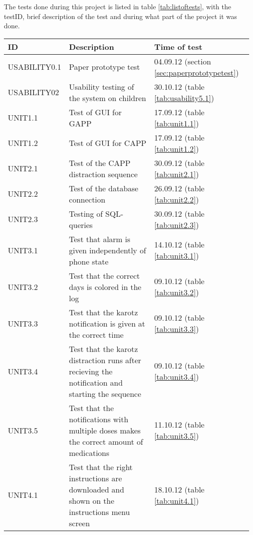The tests done during this project is listed in table \ref{tab:listoftests}, with the testID, brief description of the test
and during what part of the project it was done.
\begin{table}
	\begin{center}
		\begin{tabular}{|p{3.3cm}|p{10.0cm}|p{4.0cm}|}
			\hline
				\bf{ID} & \bf{Description}& \bf{Time of test}\\
			\hline
				USABILITY0.1 &	 Paper prototype test &  						04.09.12 (section \ref{sec:paperprototypetest})\\
				\hline
				USABILITY02 & 	Usability testing of the system on children & 			30.10.12 (table \ref{tab:usability5.1})\\
				\hline
				UNIT1.1 &		Test of GUI for GAPP & 												17.09.12 (table \ref{tab:unit1.1})\\
				\hline
				UNIT1.2 & 		Test of GUI for CAPP & 												17.09.12 (table \ref{tab:unit1.2})\\
				\hline
				UNIT2.1 & 		Test of the CAPP distraction sequence & 									30.09.12 (table \ref{tab:unit2.1})\\
				\hline
				UNIT2.2 & 		Test of the database connection & 										26.09.12 (table \ref{tab:unit2.2})\\
				\hline
				UNIT2.3 & 		Testing of SQL-queries &		 										30.09.12 (table \ref{tab:unit2.3})\\
				\hline
				UNIT3.1 & 		Test that alarm is given independently of phone state & 							14.10.12 (table \ref{tab:unit3.1})\\
				\hline
				UNIT3.2 & 		Test that the correct days is colored in the log &								09.10.12 (table \ref{tab:unit3.2})\\
				\hline
				UNIT3.3 & 		Test that the karotz notification is given at the correct time & 						09.10.12 (table \ref{tab:unit3.3})\\
				\hline
				UNIT3.4 & 		Test that the karotz distraction runs after recieving the notification and starting the sequence & 	09.10.12 (table \ref{tab:unit3.4})\\
				\hline
				UNIT3.5 & 		Test that the notifications with multiple doses makes the correct amount of medications & 		11.10.12 (table \ref{tab:unit3.5})\\
				\hline
				UNIT4.1 & 		Test that the right instructions are downloaded and shown on the instructions menu screen & 	18.10.12 (table \ref{tab:unit4.1})\\

\end{tabular}
\end{center}
\end{table}
